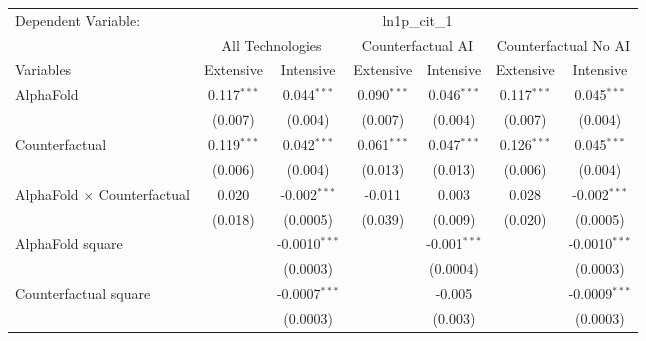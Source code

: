 \begingroup
\centering
\begin{tabular}{lcccccc}
   \tabularnewline \midrule \midrule
   Dependent Variable: & \multicolumn{6}{c}{ln1p\_cit\_1}\\
 & \multicolumn{2}{c}{All Technologies} & \multicolumn{2}{c}{Counterfactual AI} & \multicolumn{2}{c}{Counterfactual No AI} \\
\cmidrule(lr){1-1}\cmidrule(lr){2-3} \cmidrule(lr){4-5} \cmidrule(lr){6-7}
Variables & \multicolumn{1}{c}{Extensive} & \multicolumn{1}{c}{Intensive} & \multicolumn{1}{c}{Extensive} & \multicolumn{1}{c}{Intensive} & \multicolumn{1}{c}{Extensive} & \multicolumn{1}{c}{Intensive} \\
\cmidrule(lr){1-1}\cmidrule(lr){2-2} \cmidrule(lr){3-3} \cmidrule(lr){4-4} \cmidrule(lr){5-5} \cmidrule(lr){6-6} \cmidrule(lr){7-7}
   AlphaFold                          & 0.117$^{***}$ & 0.044$^{***}$     & 0.090$^{***}$ & 0.046$^{***}$  & 0.117$^{***}$ & 0.045$^{***}$\\   
                                      & (0.007)       & (0.004)           & (0.007)       & (0.004)        & (0.007)       & (0.004)\\   
   Counterfactual                     & 0.119$^{***}$ & 0.042$^{***}$     & 0.061$^{***}$ & 0.047$^{***}$  & 0.126$^{***}$ & 0.045$^{***}$\\   
                                      & (0.006)       & (0.004)           & (0.013)       & (0.013)        & (0.006)       & (0.004)\\   
   AlphaFold $\times$ Counterfactual  & 0.020         & -0.002$^{***}$    & -0.011        & 0.003          & 0.028         & -0.002$^{***}$\\   
                                      & (0.018)       & (0.0005)          & (0.039)       & (0.009)        & (0.020)       & (0.0005)\\   
   AlphaFold square                   &               & -0.0010$^{***}$   &               & -0.001$^{***}$ &               & -0.0010$^{***}$\\   
                                      &               & (0.0003)          &               & (0.0004)       &               & (0.0003)\\   
   Counterfactual square              &               & -0.0007$^{***}$   &               & -0.005         &               & -0.0009$^{***}$\\   
                                      &               & (0.0003)          &               & (0.003)        &               & (0.0003)\\   

\end{tabular}
